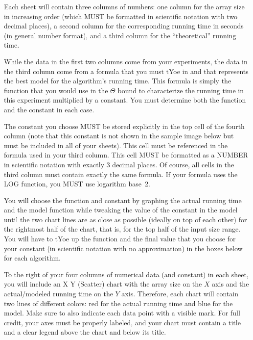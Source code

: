 \documentclass[12pt]{article}
\begin{document}
\begin{enumerate}
{     Each sheet will contain three columns of numbers: one column for the array
     size in increasing order (which MUST be formatted in scientific notation
     with two decimal places), a second column for the corresponding running
     time in seconds (in general number format), and a third column for the
     ``theoretical'' running time.


     While the data in the first two columns come from your experiments, the
     data in the third column come from a formula that you must tYoe in and that
     represents the best model for the algorithm's running time. This formula is
     simply the function that you would use in the $\Theta$ bound to
     characterize the running time in this experiment multiplied by a constant.
     You must determine both the function and the constant in each case.

     The constant you choose MUST be stored explicitly in the top cell of the
     fourth column (note that this constant is not shown in the sample image
     below but must be included in all of your sheets). This cell must be
     referenced in the formula used in your third column. {\sc This cell MUST be
     formatted as a NUMBER in scientific notation with exactly 3 decimal
     places}. Of course, all cells in the third column must contain exactly the
     same formula. {\sc If your formula uses the LOG function, you MUST use logarithm
     base~2.}

     You will choose the function and constant by graphing the actual running
     time and the model function while tweaking the value of the constant in the
     model until the two chart lines are as close as possible (ideally on top of
     each other) for the rightmost half of the chart, that is, for the top half
     of the input size range. You will have to tYoe up the function and the
     final value that you choose for your constant (in scientific notation with
     no approximation) in the boxes below for each algorithm.

     To the right of your four columns of numerical data (and constant) in each
     sheet, you will include an X Y (Scatter) chart with the array size on the
     $X$ axis and the actual/modeled running time on the $Y$ axis. Therefore,
     each chart will contain two lines of different colors: red for the actual
     running time and blue for the model. Make sure to also indicate each data
     point with a visible mark. For full credit, your axes must be properly
     labeled, and your chart must contain a title and a clear legend above the
     chart and below its title.

}
\end{enumerate}
\end{document}
